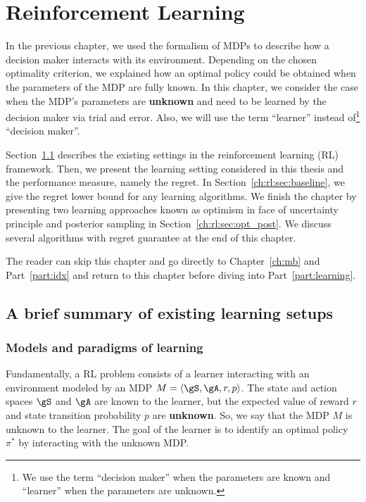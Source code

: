 \begingroup

\let\clearpage\relax

\chapter{Reinforcement Learning}
\label{ch:rl}

In the previous chapter, we used the formalism of MDPs to describe how a decision maker interacts with its environment.
Depending on the chosen optimality criterion, we explained how an optimal policy could be obtained when the parameters of the MDP are fully known.
In this chapter, we consider the case when the MDP's parameters are \textbf{unknown} and need to be learned by the decision maker via trial and error.
Also, we will use the term ``learner'' instead of\footnote{We use the term ``decision maker'' when the parameters are known and ``learner'' when the parameters are unknown.} ``decision maker''.

Section~\ref{ch:rl:sec:overal} describes the existing settings in the reinforcement learning (RL) framework.
Then, we present the learning setting considered in this thesis and the performance measure, namely the regret. 
In Section~\ref{ch:rl:sec:baseline}, we give the regret lower bound for any learning algorithms.
We finish the chapter by presenting two learning approaches known as optimism in face of uncertainty principle and posterior sampling in Section~\ref{ch:rl:sec:opt_post}.
We discuss several algorithms with regret guarantee at the end of this chapter.

The reader can skip this chapter and go directly to Chapter~\ref{ch:mb} and Part~\ref{part:idx} and return to this chapter before diving into Part~\ref{part:learning}.

\section{A brief summary of existing learning setups}
\label{ch:rl:sec:overal}

\subsection{Models and paradigms of learning}

Fundamentally, a RL problem consists of a learner interacting with an environment modeled by an MDP $M=\langle\gS,\gA,r,p\rangle$.
The state and action spaces $\gS$ and $\gA$ are known to the learner, but the expected value of reward $r$ and state transition probability $p$ are \textbf{unknown}.
So, we say that the MDP $M$ is unknown to the learner.
The goal of the learner is to identify an optimal policy $\pi^*$ by interacting with the unknown MDP.

